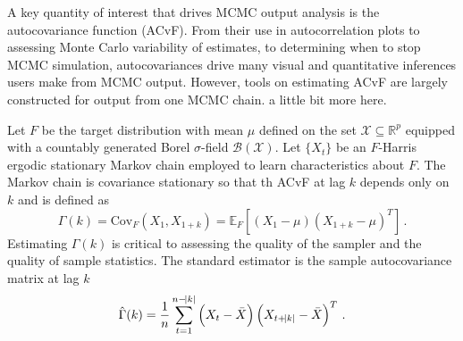 \documentclass[11pt]{article}
\newcommand{\Cov}{\text{Cov}}
\newcommand{\X}{\mathcal{X}}
\theoremstyle{remark}
\begin{document}
A key quantity of interest that drives MCMC output analysis is the autocovariance function (ACvF). From their use in autocorrelation plots to assessing Monte Carlo variability of estimates, to determining when to stop MCMC simulation, autocovariances drive many visual and quantitative inferences users make from MCMC output. However, tools on estimating ACvF are largely constructed for output from one MCMC chain. {\color{blue} a little bit more here}.



Let $F$ be the target distribution with mean $\mu$ defined on the set $\X \subseteq \mathbb{R}^p$ equipped with a countably generated Borel $\sigma$-field $\mathcal{B}(\X)$. Let $\{X_t\}$ be an $F$-Harris ergodic stationary Markov chain \citep[see][for definitions]{meyn:twee:2009} employed to learn characteristics about $F$.
The Markov chain is covariance stationary so that
th ACvF at lag $k$ depends only on $k$ and is defined as 
%
\[
    \Gamma(k) = \Cov_F(X_1, X_{1+k})= \mathbb{E}_F \left[(X_1 - \mu)(X_{1+k} - \mu)^T \right]\,.
\]
Estimating $\Gamma(k)$ is critical to assessing the quality of the sampler and the quality of  sample statistics. The standard estimator is the sample autocovariance matrix at lag $k$
%
\begin{equation} \label{eq:empirical_acf}
    \hat{\Gamma}(k) = \dfrac{1}{n}\sum_{t=1}^{n-\abs{k}} \left(X_t - \bar{X} \right) \left(X_{t+\abs{k}} - \bar{X} \right)^T\,.
\end{equation}
%
\end{document}

